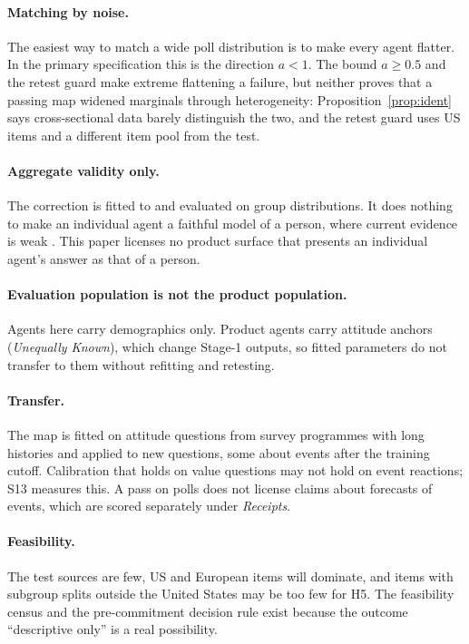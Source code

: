 \documentclass[11pt]{article}
\begin{document}
\paragraph{Matching by noise.} The easiest way to match a wide poll distribution is to make every agent flatter. In the primary specification this is the direction $a<1$. The bound $a\ge0.5$ and the retest guard make extreme flattening a failure, but neither proves that a passing map widened marginals through heterogeneity: Proposition~\ref{prop:ident} says cross-sectional data barely distinguish the two, and the retest guard uses US items and a different item pool from the test.

\paragraph{Aggregate validity only.} The correction is fitted to and evaluated on group distributions. It does nothing to make an individual agent a faithful model of a person, where current evidence is weak \citep{peng2025funhouse}. This paper licenses no product surface that presents an individual agent's answer as that of a person.

\paragraph{Evaluation population is not the product population.} Agents here carry demographics only. Product agents carry attitude anchors (\emph{Unequally Known}), which change Stage-1 outputs, so fitted parameters do not transfer to them without refitting and retesting.

\paragraph{Transfer.} The map is fitted on attitude questions from survey programmes with long histories and applied to new questions, some about events after the training cutoff. Calibration that holds on value questions may not hold on event reactions; S13 measures this. A pass on polls does not license claims about forecasts of events, which are scored separately under \emph{Receipts}.

\paragraph{Feasibility.} The test sources are few, US and European items will dominate, and items with subgroup splits outside the United States may be too few for H5. The feasibility census and the pre-commitment decision rule exist because the outcome ``descriptive only'' is a real possibility.
\end{document}
